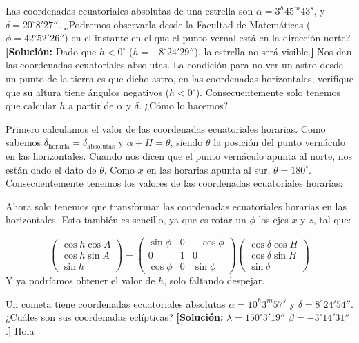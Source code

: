 \begin{texercise}
	Las coordenadas ecuatoriales absolutas de una estrella son 	$\alpha = 3^{h}45^{m}43^{s}$, y $\delta = 20^\circ8'27''$. ¿Podremos observarla desde la Facultad de Matemáticas ($\phi = 42^\circ52'26''$) en el instante en el que el punto 
	vernal está en la dirección norte? \textbf{[Solución:} Dado que $h < 0^\circ$ 
	($h = -8^\circ24'29''$), la estrella no será visible.\textbf{]}
	\tcblower
	Nos dan las coordenadas ecuatoriales absolutas. La condición para no ver un astro desde un punto de la tierra es que dicho astro, en las coordenadas horizontales, verifique que su altura tiene ángulos negativos ($h<0^\circ$). Consecuentemente solo tenemos que calcular $h$ a partir de $\alpha$ y $\delta$. ¿Cómo lo hacemos? 
	
	Primero calculamos el valor de las coordenadas ecuatoriales horarias. Como sabemos $\delta_{\mathrm{horaria}} = \delta_{\mathrm{absolutas}}$ y $\alpha+H=\theta$, siendo $\theta$ la posición del punto vernáculo en las horizontales. Cuando nos dicen que el punto vernáculo apunta al norte, nos están dado el dato de $\theta$. Como $x$ en las horarias apunta al sur, $\theta=180^\circ$. Consecuentemente tenemos los valores de las coordenadas ecuatoriales horarias: 
	
	Ahora solo tenemos que transformar las coordenadas ecuatoriales horarias en las horizontales. Esto también es sencillo, ya que es rotar un $\phi$ los ejes $x$ y $z$, tal que: 
	
	\begin{equation}
		\begin{pmatrix}
			\cos h \cos A \\
			\cos h \sin A \\
			\sin h 
		\end{pmatrix} =\begin{pmatrix}
			\sin \phi & 0 &- \cos \phi \\
			0 & 1 & 0 \\
			 \cos \phi & 0 & \sin \phi
		\end{pmatrix}
		\begin{pmatrix}
			\cos \delta \cos H \\
			\cos \delta \sin H \\
			\sin \delta
		\end{pmatrix}
	\end{equation}
	Y ya podríamos obtener el valor de $h$, solo faltando despejar. 
\end{texercise}
\begin{texercise}
	Un cometa tiene coordenadas ecuatoriales absolutas $\alpha = 10^{h}3^{m}57^{s}$ y $\delta = 8^\circ24'54''$. ¿Cuáles son sus coordenadas eclípticas?  
	\textbf{[Solución:} $\lambda = 150^\circ3'19''$	$\beta = -3^\circ14'31''$.\textbf{]}
	\tcblower
	Hola
\end{texercise}

\tcbstoprecording
